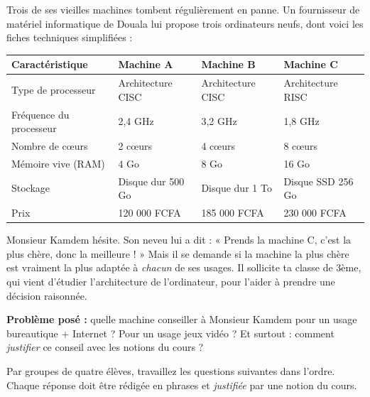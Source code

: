 \documentclass[11pt]{article}
\newcounter{popsec}
\newcounter{popsub}
\newcommand{\courssub}[1]{%
  \stepcounter{popsub}%
  \par\vspace{9pt}\noindent{\popxbold\fontsize{11.5}{13}\selectfont\color{popink}{\color{poporange}\thepopsec.\thepopsub}\hspace{6pt}#1}\par\nopagebreak\vspace{4pt}
}
\begin{document}
Trois de ses vieilles machines tombent régulièrement en panne. Un fournisseur de matériel informatique de Douala lui propose trois ordinateurs neufs, dont voici les fiches techniques simplifiées :

\begin{center}
\begin{tabularx}{\linewidth}{|l|X|X|X|}
\hline
\rowcolor{popblueL} \textbf{Caractéristique} & \textbf{Machine A} & \textbf{Machine B} & \textbf{Machine C} \\
\hline
Type de processeur & Architecture CISC & Architecture CISC & Architecture RISC \\
\hline
Fréquence du processeur & 2,4 GHz & 3,2 GHz & 1,8 GHz \\
\hline
Nombre de cœurs & 2 cœurs & 4 cœurs & 8 cœurs \\
\hline
Mémoire vive (RAM) & 4 Go & 8 Go & 16 Go \\
\hline
Stockage & Disque dur 500 Go & Disque dur 1 To & Disque SSD 256 Go \\
\hline
Prix & 120 000 FCFA & 185 000 FCFA & 230 000 FCFA \\
\hline
\end{tabularx}
\end{center}

Monsieur Kamdem hésite. Son neveu lui a dit : « Prends la machine C, c'est la plus chère, donc la meilleure ! » Mais il se demande si la machine la plus chère est vraiment la plus adaptée à \emph{chacun} de ses usages. Il sollicite ta classe de 3ème, qui vient d'étudier l'architecture de l'ordinateur, pour l'aider à prendre une décision raisonnée.

\textbf{Problème posé :} quelle machine conseiller à Monsieur Kamdem pour un usage bureautique + Internet ? Pour un usage jeux vidéo ? Et surtout : comment \emph{justifier} ce conseil avec les notions du cours ?

\courssub{Consignes}

Par groupes de quatre élèves, travaillez les questions suivantes dans l'ordre. Chaque réponse doit être rédigée en phrases et \emph{justifiée} par une notion du cours.
\end{document}

